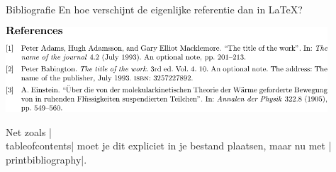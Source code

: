 
\begin{frame}{Bibliografie}
	En hoe verschijnt de eigenlijke referentie dan in \LaTeX?
	
	\begin{center}
		\includegraphics[width=0.9\textwidth]{assets/snippetReferences/snippetReferences.pdf}
	\end{center}
	
	Net zoals \hll|\\tableofcontents| moet je dit expliciet in je bestand plaatsen, maar nu met
	\hll|\\printbibliography|.
\end{frame}
